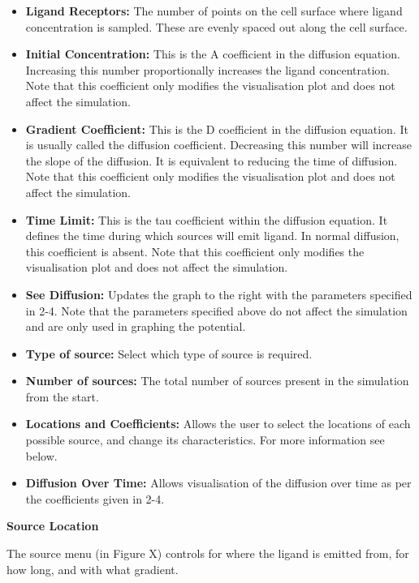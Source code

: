 \documentclass[11.5pt]{article}
\begin{document}
\begin{itemize}
\item {\bfseries Ligand Receptors:} The number of points on the cell 
surface where ligand concentration is sampled. These are evenly spaced 
out along the cell surface.
\item {\bfseries Initial Concentration:} This is the A coefficient in the 
diffusion equation. Increasing this number proportionally increases the 
ligand concentration. Note that this coefficient only modifies the 
visualisation plot and does not affect the simulation.
\item {\bfseries Gradient Coefficient: }This is the D coefficient in the 
diffusion equation. It is usually called the diffusion coefficient. 
Decreasing this number will increase the slope of the diffusion. It is 
equivalent to reducing the time of diffusion. Note that this coefficient 
only modifies the visualisation plot and does not affect the simulation.
\item {\bfseries Time Limit:} This is the tau coefficient within the 
diffusion equation. It defines the time during which sources will emit 
ligand. In normal diffusion, this coefficient is absent. Note that this 
coefficient only modifies the visualisation plot and does not affect the 
simulation.
\item {\bfseries See Diffusion: }Updates the graph to the right with the 
parameters specified in 2-4. Note that the parameters specified above do 
not affect the simulation and are only used in graphing the potential.
\item {\bfseries Type of source:} Select which type of source is 
required.
\item {\bfseries Number of sources: }The total number of sources present 
in the simulation from the start.
\item {\bfseries Locations and Coefficients: }Allows the user to select 
the locations of each possible source, and change its characteristics. 
For more information see below.
\item {\bfseries Diffusion Over Time:} Allows visualisation of the 
diffusion over time as per the coefficients given in 2-4.
\setcounter{numberedCntC}{\theenumi}
\end{itemize}


{\bfseries Source Location}

The source menu (in Figure X) controls for where the ligand is emitted 
from, for how long, and with what gradient.
\end{document}
